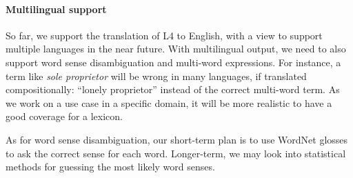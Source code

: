 \documentclass[11pt]{article}
\begin{document}
\paragraph{Multilingual support}

So far, we support the translation of L4 to English, with a view to support multiple languages in the near future. 
With multilingual output, we need to also support word sense disambiguation and multi-word expressions. For instance, a term like \textit{sole proprietor} will be wrong in many languages, if translated compositionally: ``lonely proprietor'' instead of the correct multi-word term. As we work on a use case in a specific domain, it will be more realistic to have a good coverage for a lexicon.

As for word sense disambiguation, our short-term plan is to use WordNet \cite{fellbaum1998wordnet} glosses to ask the correct sense for each word. Longer-term, we may look into statistical methods for guessing the most likely word senses.








\end{document}
